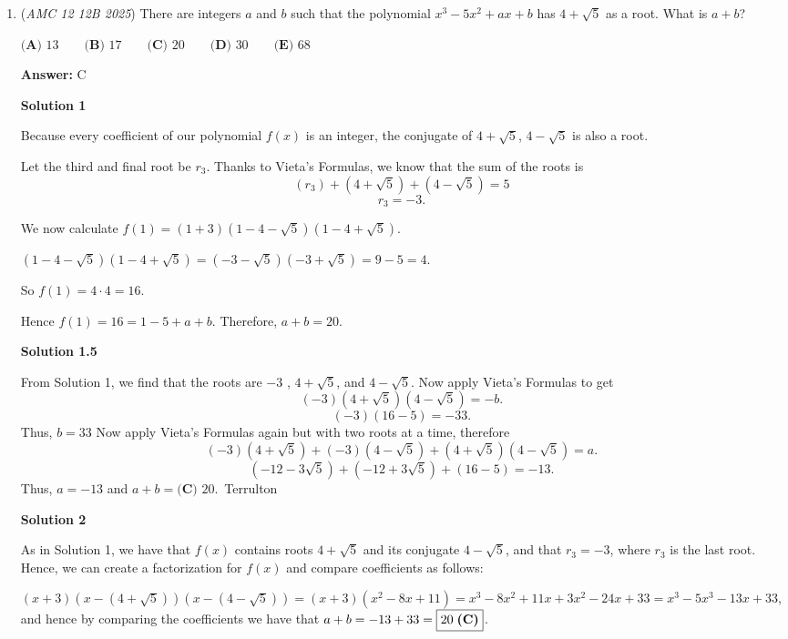 \begin{enumerate}
 


	\item (\textit{AMC 12 12B 2025}) There are integers $a$ and $b$ such that the polynomial $x^3 - 5x^2 + ax + b$ has $4+\sqrt{5}$ as a root. What is $a+b$?


 $\textbf{(A) } 13 \qquad \textbf{(B) } 17 \qquad \textbf{(C) } 20 \qquad \textbf{(D) } 30 \qquad \textbf{(E) } 68$

 \textbf{Answer: }C



\textbf{Solution 1}

Because every coefficient of our polynomial $f(x)$ is an integer, the conjugate of $4+\sqrt{5}$, $4-\sqrt{5}$ is also a root. 

 Let the third and final root be $r_3$. Thanks to Vieta's Formulas, we know that the sum of the roots is
 \[(r_3) + (4+\sqrt{5}) + (4 - \sqrt{5}) = 5\] 
 \[r_3 = -3.\]

 We now calculate $f(1) = (1+3)(1-4-\sqrt{5})(1-4+\sqrt{5})$.

 $(1-4-\sqrt{5})(1-4+\sqrt{5}) = (-3-\sqrt{5})(-3+\sqrt{5}) = 9 - 5 = 4.$

 So $f(1) = 4 \cdot 4 = 16.$

 Hence $f(1) = 16 = 1-5 + a + b$. Therefore, $a + b = \boxed{20}$.

 



\textbf{Solution 1.5}

From Solution 1, we find that the roots are $-3$ , $4+\sqrt{5}$, and $4-\sqrt{5}$. Now apply Vieta's Formulas to get
 \[(-3)(4+\sqrt{5})(4-\sqrt{5}) = -b.\]
 \[(-3)(16-5) = -33.\]Thus, $b = 33$ Now apply Vieta's Formulas again but with two roots at a time, therefore
 \[(-3)(4+\sqrt{5}) + (-3)(4-\sqrt{5}) + (4+\sqrt{5})(4-\sqrt{5}) = a.\]
 \[(-12 - 3\sqrt{5}) + (-12 + 3\sqrt{5}) + (16-5) = -13.\]Thus, $a = -13$ and $a + b=\boxed{\textbf{(C) } 20}$.~Terrulton

 



\textbf{Solution 2}

As in Solution 1, we have that $f(x)$ contains roots $4+\sqrt{5}$ and its conjugate $4-\sqrt{5}$, and that $r_3=-3$, where $r_3$ is the last root. Hence, we can create a factorization for $f(x)$ and compare coefficients as follows:

 $(x+3)(x-(4+\sqrt{5}))(x-(4-\sqrt{5}))=(x+3)(x^2-8x+11)=x^3-8x^2+11x+3x^2-24x+33=x^3-5x^3-13x+33$, and hence by comparing the coefficients we have that $a+b=-13+33=\boxed{20\hspace{1mm}\textbf{(C)}}$.


\end{enumerate}
